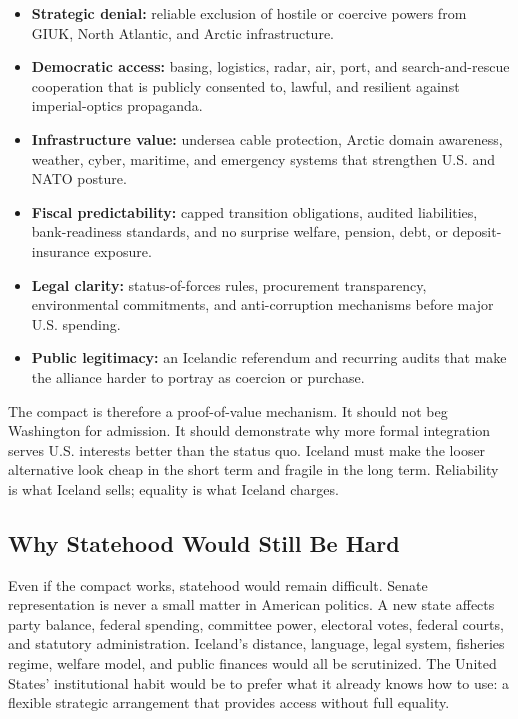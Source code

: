 \documentclass[11pt,a4paper]{article}
\begin{document}
\begin{itemize}
  \item \textbf{Strategic denial:} reliable exclusion of hostile or coercive powers from GIUK, North Atlantic, and Arctic infrastructure.
  \item \textbf{Democratic access:} basing, logistics, radar, air, port, and search-and-rescue cooperation that is publicly consented to, lawful, and resilient against imperial-optics propaganda.
  \item \textbf{Infrastructure value:} undersea cable protection, Arctic domain awareness, weather, cyber, maritime, and emergency systems that strengthen U.S. and NATO posture.
  \item \textbf{Fiscal predictability:} capped transition obligations, audited liabilities, bank-readiness standards, and no surprise welfare, pension, debt, or deposit-insurance exposure.
  \item \textbf{Legal clarity:} status-of-forces rules, procurement transparency, environmental commitments, and anti-corruption mechanisms before major U.S. spending.
  \item \textbf{Public legitimacy:} an Icelandic referendum and recurring audits that make the alliance harder to portray as coercion or purchase.
\end{itemize}

The compact is therefore a proof-of-value mechanism. It should not beg Washington for admission. It should demonstrate why more formal integration serves U.S. interests better than the status quo. Iceland must make the looser alternative look cheap in the short term and fragile in the long term. Reliability is what Iceland sells; equality is what Iceland charges.

\subsection{Why Statehood Would Still Be Hard}
Even if the compact works, statehood would remain difficult. Senate representation is never a small matter in American politics. A new state affects party balance, federal spending, committee power, electoral votes, federal courts, and statutory administration. Iceland's distance, language, legal system, fisheries regime, welfare model, and public finances would all be scrutinized. The United States' institutional habit would be to prefer what it already knows how to use: a flexible strategic arrangement that provides access without full equality.
\end{document}
